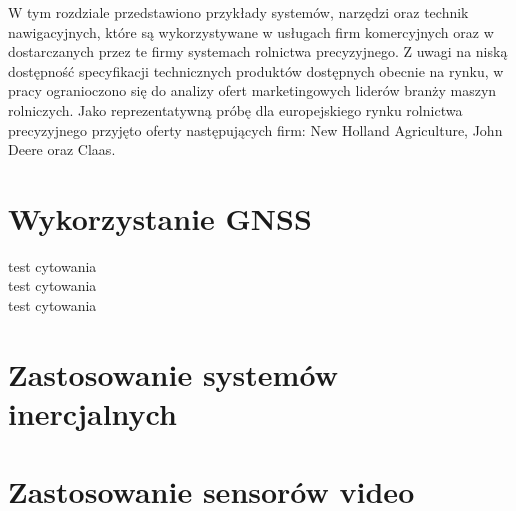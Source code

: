 W tym rozdziale przedstawiono przykłady systemów, narzędzi oraz technik nawigacyjnych, które są wykorzystywane w usługach firm komercyjnych 
oraz w dostarczanych przez te firmy systemach rolnictwa precyzyjnego. Z uwagi na niską dostępność specyfikacji technicznych produktów 
dostępnych obecnie na rynku, w pracy ogranioczono się do analizy ofert marketingowych liderów branży maszyn rolniczych.
Jako reprezentatywną próbę dla europejskiego rynku rolnictwa precyzyjnego przyjęto oferty następujących firm: New Holland Agriculture,
John Deere oraz Claas. 
\section{Wykorzystanie GNSS}
 test cytowania \cite{CLAAS_stearing_systems}\\
	test cytowania \cite{JOHN_DEERE_solutions}\\
	test cytowania \cite{NEW_HOLLAND_PLM}
\section{Zastosowanie systemów inercjalnych}

\section{Zastosowanie sensorów video}

